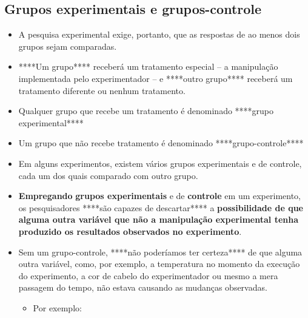 \documentclass[
]{book}
\providecommand{\tightlist}{%
  \setlength{\itemsep}{0pt}\setlength{\parskip}{0pt}}
\begin{document}
\hypertarget{grupos-experimentais-e-grupos-controle}{%
\subsection{Grupos experimentais e grupos-controle}\label{grupos-experimentais-e-grupos-controle}}

\begin{itemize}
\tightlist
\item
  A pesquisa experimental exige, portanto, que as respostas de ao menos dois grupos sejam comparadas.
\item
  ****Um grupo**** receberá um tratamento especial -- a manipulação implementada pelo experimentador -- e ****outro grupo**** receberá um tratamento diferente ou nenhum tratamento.
\item
  Qualquer grupo que recebe um tratamento é denominado ****grupo experimental****
\item
  Um grupo que não recebe tratamento é denominado ****grupo-controle****
\item
  Em alguns experimentos, existem vários grupos experimentais e de controle, cada um dos quais comparado com outro grupo.
\item
  \textbf{Empregando} \textbf{grupos experimentais} e de \textbf{controle} em um experimento, os pesquisadores ****são capazes de descartar**** a \textbf{possibilidade de que alguma outra variável que não a manipulação experimental tenha produzido os resultados observados no experimento}.
\item
  Sem um grupo-controle, ****não poderíamos ter certeza**** de que alguma outra variável, como, por exemplo, a temperatura no momento da execução do experimento, a cor de cabelo do experimentador ou mesmo a mera passagem do tempo, não estava causando as mudanças observadas.

  \begin{itemize}
  \tightlist
  \item
    Por exemplo:


\end{itemize}
\end{itemize}
\end{document}

